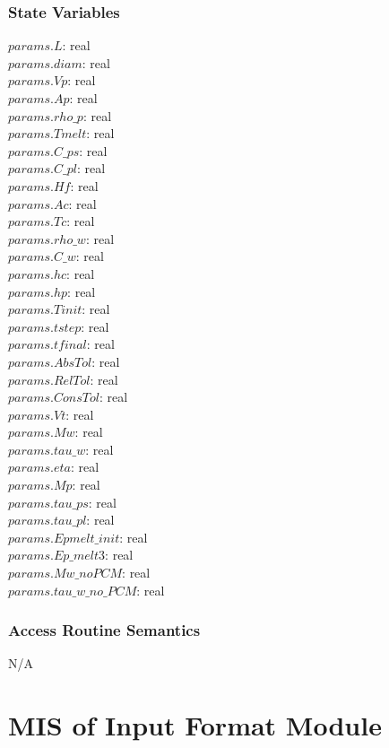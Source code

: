 \documentclass[12pt]{article}
\begin{document}
\subsubsection{State Variables}
$params$.$L$: real \\
$params$.$diam$: real \\
$params$.$Vp$: real \\
$params$.$Ap$: real \\
$params$.$rho\_p$: real \\
$params$.$Tmelt$: real \\
$params$.$C\_ps$: real \\
$params$.$C\_pl$: real \\
$params$.$Hf$: real \\
$params$.$Ac$: real \\
$params$.$Tc$: real \\
$params$.$rho\_w$: real \\
$params$.$C\_w$: real \\
$params$.$hc$: real \\
$params$.$hp$: real \\
$params$.$Tinit$: real \\
$params$.$tstep$: real \\
$params$.$tfinal$: real \\
$params$.$AbsTol$: real \\
$params$.$RelTol$: real \\
$params$.$ConsTol$: real \\
$params$.$Vt$: real \\
$params$.$Mw$: real \\
$params$.$tau\_w$: real \\
$params$.$eta$: real \\
$params$.$Mp$: real \\
$params$.$tau\_ps$: real \\
$params$.$tau\_pl$: real \\
$params$.$Epmelt\_init$: real \\
$params$.$Ep\_melt3$: real \\ 
$params$.$Mw\_noPCM$: real \\
$params$.$tau\_w\_no\_PCM$: real
\subsubsection{Access Routine Semantics}
N/A

\section{MIS of Input Format Module} \label{Load}
\end{document}

